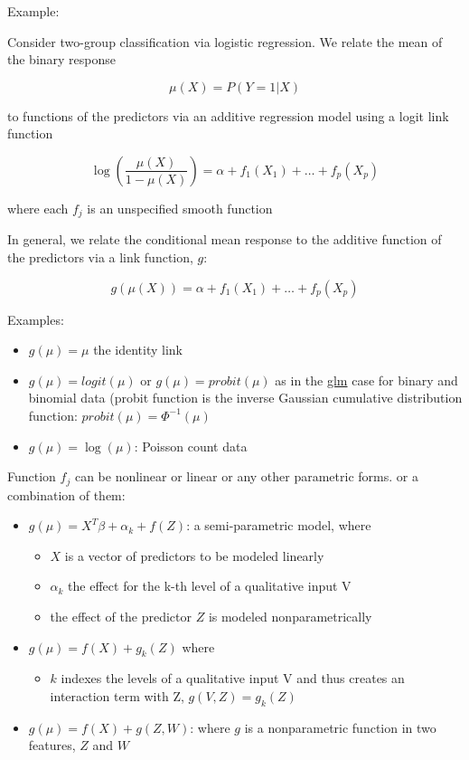 \documentclass[
]{book}
\providecommand{\tightlist}{%
  \setlength{\itemsep}{0pt}\setlength{\parskip}{0pt}}
\begin{document}
Example:

Consider two-group classification via logistic regression. We relate the mean of the binary response

\[
\mu(X) = P(Y=1|X)
\]

to functions of the predictors via an additive regression model using a logit link function

\[
\log(\frac{\mu(X)}{1- \mu(X)}) = \alpha + f_1 (X_1) + \dots + f_p(X_p)
\]

where each \(f_j\) is an unspecified smooth function

In general, we relate the conditional mean response to the additive function of the predictors via a link function, \(g\):

\[
g(\mu(X)) = \alpha + f_1(X_1) + \dots + f_p(X_p)
\]

Examples:

\begin{itemize}
\item
  \(g(\mu) = \mu\) the identity link
\item
  \(g(\mu) = logit(\mu)\) or \(g(\mu) = probit(\mu)\) as in the \href{https://bookdown.org/mike/data_analysis/generalized-linear-models.html}{glm} case for binary and binomial data (probit function is the inverse Gaussian cumulative distribution function: \(probit (\mu) = \Phi^{-1}(\mu)\)
\item
  \(g(\mu) = \log(\mu)\): Poisson count data
\end{itemize}

Function \(f_j\) can be nonlinear or linear or any other parametric forms. or a combination of them:

\begin{itemize}
\item
  \(g(\mu) = X^T \beta + \alpha_k + f(Z)\): a semi-parametric model, where

  \begin{itemize}
  \item
    \(X\) is a vector of predictors to be modeled linearly
  \item
    \(\alpha_k\) the effect for the k-th level of a qualitative input V
  \item
    the effect of the predictor \(Z\) is modeled nonparametrically
  \end{itemize}
\item
  \(g(\mu) = f(X) + g_k(Z)\) where

  \begin{itemize}
  \tightlist
  \item
    \(k\) indexes the levels of a qualitative input V and thus creates an interaction term with Z, \(g(V,Z) =g_k(Z)\)
  \end{itemize}
\item
  \(g(\mu)= f(X)+g(Z,W)\): where \(g\) is a nonparametric function in two features, \(Z\) and \(W\)
\end{itemize}
\end{document}
